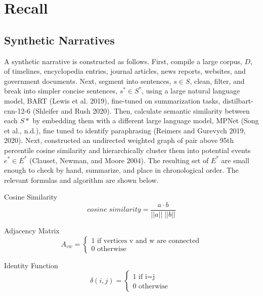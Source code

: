 \documentclass{article}
\begin{document}
\hypertarget{recall}{%
\section{Recall}\label{recall}}

\hphantom{em}

\hypertarget{synthetic-narratives}{%
\subsection{Synthetic Narratives}\label{synthetic-narratives}}

\hphantom{em}

A synthetic narrative is constructed as follows. First, compile a large
corpus, \(D\), of timelines, encyclopedia entries, journal articles,
news reports, websites, and government documents. Next, segment into
sentences, \(s \in S\), clean, filter, and break into simpler concise
sentences, \(s^* \in S^*\), using a large natural language model, BART
(Lewis et al. 2019), fine-tuned on summarization tasks,
distilbart-cnn-12-6 (Shleifer and Rush 2020). Then, calculate semantic
similarity between each \(S*\) by embedding them with a different large
language model, MPNet (Song et al., n.d.), fine tuned to identify
paraphrasing (Reimers and Gurevych 2019, 2020). Next, constructed an
undirected weighted graph of pair above 95th percentile cosine
similarity and hierarchically cluster them into potential events
\(e^* \in E^*\) (Clauset, Newman, and Moore 2004). The resulting set of
\(E^*\) are small enough to check by hand, summarize, and place in
chronological order. The relevant formulas and algorithm are shown
below.

Cosine Similarity \begin{equation}
cosine\;similarity = \frac{a \cdot b}{ || a  ||\;|| b  || }
\end{equation}

Adjacency Matrix \begin{equation} \label{eq:sclrec2}
A_{vw}= \begin{cases} 1 \text{ if vertices v and w are connected} \\ 0 \text{ otherwise } \end{cases}
\end{equation}

Identity Function \begin{equation}
\delta(i,j)= \begin{cases} 1 \text{ if i=j} \\ 0 \text{ otherwise } \end{cases}
\end{equation}
\end{document}
